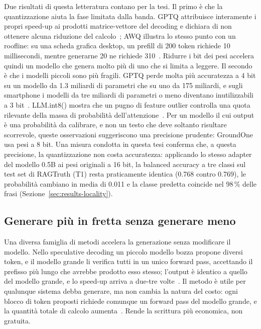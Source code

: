 Due risultati di questa letteratura contano per la tesi. Il primo è che la quantizzazione aiuta la fase limitata dalla
banda. GPTQ attribuisce interamente i propri speed-up ai prodotti matrice-vettore del decoding e dichiara di non ottenere
alcuna riduzione del calcolo~\cite{frantar2023gptq}; AWQ illustra lo stesso punto con un roofline: su una scheda grafica
desktop, un prefill di 200 token richiede 10 millisecondi, mentre generarne 20 ne richiede 310~\cite{lin2024awq}. Ridurre
i bit dei pesi accelera quindi un modello che genera molto più di uno che si limita a leggere. Il secondo è che i modelli
piccoli sono più fragili. GPTQ perde molta più accuratezza a 4 bit su un modello da 1.3 miliardi di parametri che su uno
da 175 miliardi, e sugli smartphone i modelli da tre miliardi di parametri o meno diventano inutilizzabili a 3
bit~\cite{frantar2023gptq,laskaridis2024melting}. LLM.int8() mostra che un pugno di feature outlier controlla una quota
rilevante della massa di probabilità dell'attenzione~\cite{dettmers2022llmint8}. Per un modello il cui output è una
probabilità da calibrare, e non un testo che deve soltanto risultare scorrevole, queste osservazioni suggeriscono una
precisione prudente: GroundOne usa pesi a 8 bit. Una misura condotta in questa tesi conferma che, a questa precisione,
la quantizzazione non costa accuratezza: applicando lo stesso adapter del modello 0.5B ai pesi originali a 16 bit,
la balanced accuracy a tre classi sul test set di RAGTruth (T1) resta praticamente identica (0.768 contro 0.769), le probabilità cambiano in
media di 0.011 e la classe predetta coincide nel 98\,\% delle frasi (Sezione~\ref{sec:results-locality}).

\subsection{Generare più in fretta senza generare meno}
\label{sec:local-speculative}

Una diversa famiglia di metodi accelera la generazione senza modificare il modello. Nello speculative decoding un piccolo
modello bozza propone diversi token, e il modello grande li verifica tutti in un unico forward pass, accettando il
prefisso più lungo che avrebbe prodotto esso stesso; l'output è identico a quello del modello grande, e lo speed-up
arriva a due-tre volte~\cite{leviathan2023speculative}. Il metodo è utile per qualunque sistema debba generare, ma non cambia la natura del costo: ogni blocco di token proposti richiede comunque un forward pass del modello grande, e la quantità totale di calcolo aumenta~\cite{leviathan2023speculative}. Rende la scrittura più economica, non gratuita.

